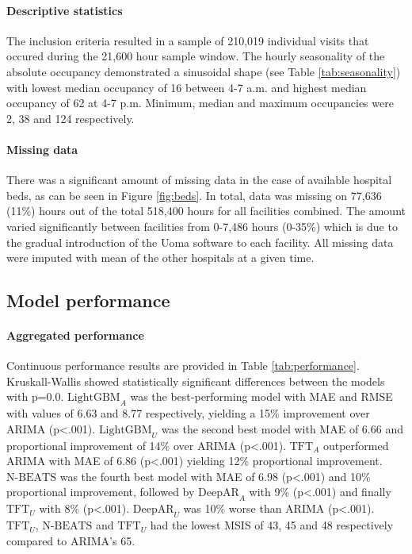 \paragraph{Descriptive statistics}\label{descriptive_statistics} The inclusion criteria resulted in a sample of 210,019 individual visits that occured during the 21,600 hour sample window. The hourly seasonality of the absolute occupancy demonstrated a sinusoidal shape (see Table \ref{tab:seasonality}) with lowest median occupancy of 16 between 4-7 a.m. and highest median occupancy of 62 at 4-7 p.m. Minimum, median and maximum occupancies were 2, 38 and 124 respectively.



\paragraph{Missing data} There was a significant amount of missing data in the case of available hospital beds, as can be seen in Figure \ref{fig:beds}. In total, data was missing on 77,636 (11\%) hours out of the total 518,400 hours for all facilities combined. The amount varied significantly between facilities from 0-7,486 hours (0-35\%) which is due to the gradual introduction of the Uoma\textsuperscript{\textregistered} software to each facility. All missing data were imputed with mean of the other hospitals at a given time.

\subsection{Model performance}
\paragraph{Aggregated performance} Continuous performance results are provided in Table \ref{tab:performance}. Kruskall-Wallis showed statistically significant differences between the models with p=0.0.  $\text{LightGBM}_A$ was the best-performing model with MAE and RMSE with values of 6.63 and 8.77 respectively, yielding a 15\% improvement over ARIMA (p<.001). $\text{LightGBM}_U$ was the second best model with MAE of 6.66 and proportional improvement of 14\% over ARIMA (p<.001). $\text{TFT}_A$ outperformed ARIMA with MAE of 6.86 (p<.001) yielding 12\% proportional improvement. $\text{N-BEATS}$ was the fourth best model with MAE of 6.98 (p<.001) and 10\% proportional improvement, followed by $\text{DeepAR}_A$ with 9\% (p<.001) and finally $\text{TFT}_U$ with 8\% (p<.001). $\text{DeepAR}_U$ was 10\% worse than ARIMA (p<.001). $\text{TFT}_U$, $\text{N-BEATS}$ and $\text{TFT}_U$ had the lowest MSIS of 43, 45 and 48 respectively compared to ARIMA's 65.

